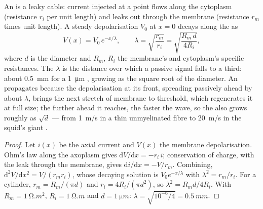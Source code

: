 \begin{theorem}\label{thm:b2:neurons-synapses:cable}
An  is a leaky cable: current injected at a point flows along
the cytoplasm (resistance $r_i$ per unit length) and leaks out
through the membrane (resistance $r_m$ times unit length). A steady
depolarisation $V_0$ at $x = 0$ decays along the  as
\[
V(x) = V_0\,e^{-x/\lambda}, \qquad \lambda = \sqrt{\frac{r_m}{r_i}} = \sqrt{\frac{R_m\,d}{4R_i}},
\]
where $d$ is the diameter and $R_m$, $R_i$ the membrane's and
cytoplasm's specific resistances. The \emph{}
$\lambda$ is the distance over which a passive signal falls to a
third: about \qty{0.5}{mm} for a \qty{1}{\micro m} , growing
as the square root of the diameter. An  propagates
because the depolarisation at its front, spreading passively ahead
by about $\lambda$, brings the next stretch of membrane to
threshold, which regenerates it at full size; the further ahead
it reaches, the faster the wave, so the  also
grows roughly as $\sqrt{d}$ --- from \qty{1}{m/s} in a thin
unmyelinated fibre to \qty{20}{m/s} in the squid's giant .
\end{theorem}
\begin{proof}
Let $i(x)$ be the axial current and $V(x)$ the membrane
depolarisation. Ohm's law along the axoplasm gives $\mathrm{d}V/
\mathrm{d}x = -r_i\,i$; conservation of charge, with the leak through
the membrane, gives $\mathrm{d}i/\mathrm{d}x = -V/r_m$. Combining,
$\mathrm{d}^{2}V/\mathrm{d}x^{2} = V/(r_m r_i)$, whose decaying
solution is $V_0 e^{-x/\lambda}$ with $\lambda^{2} = r_m/r_i$. For a
cylinder, $r_m = R_m/(\pi d)$ and $r_i = 4R_i/(\pi d^{2})$, so
$\lambda^{2} = R_m d/4R_i$. With $R_m = \qty{1}{\ohm.m^2}$, $R_i =
\qty{1}{\ohm.m}$ and $d = \qty{1}{\micro m}$: $\lambda = \sqrt{10^{-6}
/4} = \qty{0.5}{mm}$.
\end{proof}

